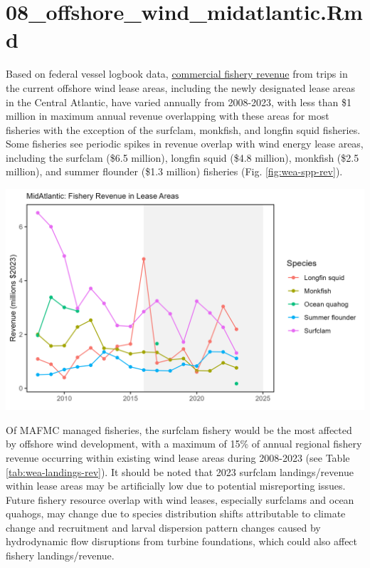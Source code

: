 \documentclass[
  10pt,
]{article}
\let\origfigure\figure
\let\endorigfigure\endfigure
\renewenvironment{figure}[1][2] {
    \expandafter\origfigure\expandafter[H]
} {
    \endorigfigure
}
\begin{document}
\section{08\_offshore\_wind\_midatlantic.Rmd}\label{offshore_wind_midatlantic.rmd}

Based on federal vessel logbook data, \href{https://noaa-edab.github.io/catalog/wind_revenue.html}{commercial fishery revenue} from trips in the current offshore wind lease areas, including the newly designated lease areas in the Central Atlantic, have varied annually from 2008-2023, with less than \$1 million in maximum annual revenue overlapping with these areas for most fisheries with the exception of the surfclam, monkfish, and longfin squid fisheries. Some fisheries see periodic spikes in revenue overlap with wind energy lease areas, including the surfclam (\$6.5 million), longfin squid (\$4.8 million), monkfish (\$2.5 million), and summer flounder (\$1.3 million) fisheries (Fig. \ref{fig:wea-spp-rev}).

\begin{figure}

{\centering \includegraphics[width=6.5in]{images/MidAtlantic/wea_spp_rev_MidAtlantic_2025-09-09} 

}

\caption{Fishery revenue in wind energy lease areas in the Mid-Atlantic.}\label{fig:wea-spp-rev}
\end{figure}

Of MAFMC managed fisheries, the surfclam fishery would be the most affected by offshore wind development, with a maximum of 15\% of annual regional fishery revenue occurring within existing wind lease areas during 2008-2023 (see Table \ref{tab:wea-landings-rev}). It should be noted that 2023 surfclam landings/revenue within lease areas may be artificially low due to potential misreporting issues. Future fishery resource overlap with wind leases, especially surfclams and ocean quahogs, may change due to species distribution shifts attributable to climate change and recruitment and larval dispersion pattern changes caused by hydrodynamic flow disruptions from turbine foundations, which could also affect fishery landings/revenue.
\end{document}
